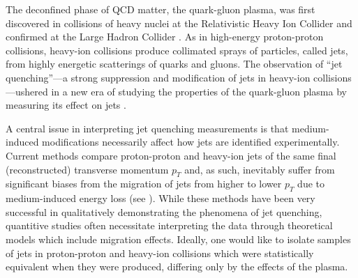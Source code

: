 \documentclass[aps,prl,twocolumn,preprintnumbers,superscriptaddress,showpacs,floatfix, nofootinbib]{revtex4-1}
\begin{document}
The deconfined phase of QCD matter, the quark-gluon plasma, was first discovered in collisions of heavy nuclei at the Relativistic Heavy Ion Collider \cite{Adler:2001nb,Arsene:2004fa,Back:2004je,Adcox:2004mh,Adams:2005dq} and confirmed at the Large Hadron Collider \cite{Aamodt:2010pa,Aad:2010bu,Chatrchyan:2011sx}.
%
As in high-energy proton-proton collisions, heavy-ion collisions produce collimated sprays of particles, called jets, from highly energetic scatterings of quarks and gluons.
%
The observation of ``jet quenching''---a strong suppression and modification of jets in heavy-ion collisions \cite{Aad:2010bu,Chatrchyan:2011sx,Adam:2015ewa}---ushered in a new era of studying the properties of the quark-gluon plasma by measuring its effect on jets \cite{Appel:1985dq,Blaizot:1986ma,Gyulassy:1990ye,Wang:1991xy,Chatrchyan:2012nia,Chatrchyan:2012gt,Chatrchyan:2013exa,Chatrchyan:2014ava,Khachatryan:2015lha,Aaboud:2017eww,Acharya:2017goa,Aaboud:2018twu,Aaboud:2018hpb,Acharya:2018uvf}. 


A central issue in interpreting jet quenching measurements is that medium-induced modifications necessarily affect how jets are identified experimentally.
%
Current methods compare proton-proton and heavy-ion jets of the same final (reconstructed) transverse momentum $p_T$ and, as such, inevitably suffer from significant biases from the migration of jets from higher to lower $p_T$ due to medium-induced energy loss (see \cite{CasalderreySolana:2007pr,dEnterria:2009xfs}).
%
While these methods have been very successful in qualitatively demonstrating the phenomena of jet quenching, quantitive studies often necessitate interpreting the data through theoretical models which include migration effects.
%
Ideally, one would like to isolate samples of jets in proton-proton and heavy-ion collisions which were statistically equivalent when they were produced, differing only by the effects of the plasma.
\end{document}
